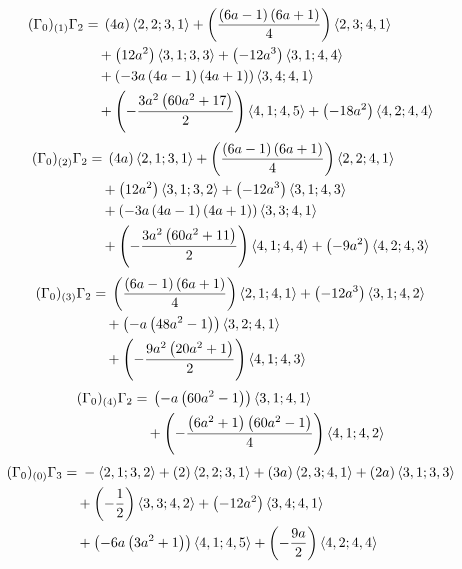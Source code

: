 \begin{align*}
(\Gamma_0)_{(1)}\Gamma_2 &={} \left(4 a\right)\langle 2,2;3,1\rangle + \left(\frac{\left(6 a - 1\right) \left(6 a + 1\right)}{4}\right)\langle 2,3;4,1\rangle\\
&\quad {}+ \left(12 a^{2}\right)\langle 3,1;3,3\rangle + \left(- 12 a^{3}\right)\langle 3,1;4,4\rangle\\
&\quad {}+ \left(- 3 a \left(4 a - 1\right) \left(4 a + 1\right)\right)\langle 3,4;4,1\rangle\\
&\quad {}+ \left(- \frac{3 a^{2} \left(60 a^{2} + 17\right)}{2}\right)\langle 4,1;4,5\rangle + \left(- 18 a^{2}\right)\langle 4,2;4,4\rangle
\end{align*}
\begin{align*}
(\Gamma_0)_{(2)}\Gamma_2 &={} \left(4 a\right)\langle 2,1;3,1\rangle + \left(\frac{\left(6 a - 1\right) \left(6 a + 1\right)}{4}\right)\langle 2,2;4,1\rangle\\
&\quad {}+ \left(12 a^{2}\right)\langle 3,1;3,2\rangle + \left(- 12 a^{3}\right)\langle 3,1;4,3\rangle\\
&\quad {}+ \left(- 3 a \left(4 a - 1\right) \left(4 a + 1\right)\right)\langle 3,3;4,1\rangle\\
&\quad {}+ \left(- \frac{3 a^{2} \left(60 a^{2} + 11\right)}{2}\right)\langle 4,1;4,4\rangle + \left(- 9 a^{2}\right)\langle 4,2;4,3\rangle
\end{align*}
\begin{align*}
(\Gamma_0)_{(3)}\Gamma_2 &={} \left(\frac{\left(6 a - 1\right) \left(6 a + 1\right)}{4}\right)\langle 2,1;4,1\rangle + \left(- 12 a^{3}\right)\langle 3,1;4,2\rangle\\
&\quad {}+ \left(- a \left(48 a^{2} - 1\right)\right)\langle 3,2;4,1\rangle\\
&\quad {}+ \left(- \frac{9 a^{2} \left(20 a^{2} + 1\right)}{2}\right)\langle 4,1;4,3\rangle
\end{align*}
\begin{align*}
(\Gamma_0)_{(4)}\Gamma_2 &={} \left(- a \left(60 a^{2} - 1\right)\right)\langle 3,1;4,1\rangle\\
&\quad {}+ \left(- \frac{\left(6 a^{2} + 1\right) \left(60 a^{2} - 1\right)}{4}\right)\langle 4,1;4,2\rangle
\end{align*}
\begin{align*}
(\Gamma_0)_{(0)}\Gamma_3 &={} -\langle 2,1;3,2\rangle + \left(2\right)\langle 2,2;3,1\rangle + \left(3 a\right)\langle 2,3;4,1\rangle + \left(2 a\right)\langle 3,1;3,3\rangle\\
&\quad {}+ \left(- \frac{1}{2}\right)\langle 3,3;4,2\rangle + \left(- 12 a^{2}\right)\langle 3,4;4,1\rangle\\
&\quad {}+ \left(- 6 a \left(3 a^{2} + 1\right)\right)\langle 4,1;4,5\rangle + \left(- \frac{9 a}{2}\right)\langle 4,2;4,4\rangle
\end{align*}

